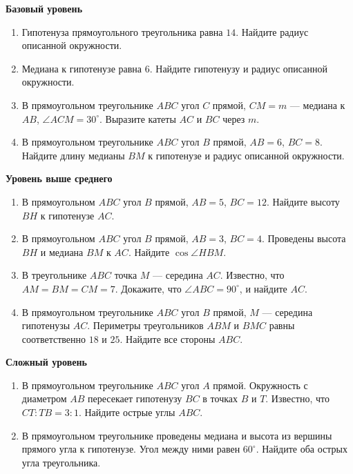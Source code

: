 \documentclass[a4paper,11pt]{article}
\begin{document}
\textcolor{darkaccent}{\textbf{Базовый уровень}}
\begin{enumerate}[label=\textbf{\arabic*.},itemsep=9pt]
\item Гипотенуза прямоугольного треугольника равна $14$. Найдите радиус описанной окружности.
\item Медиана к гипотенузе равна $6$. Найдите гипотенузу и радиус описанной окружности.
\item В прямоугольном треугольнике $ABC$ угол $C$ прямой, $CM=m$ --- медиана к $AB$, $\angle ACM=30^\circ$. Выразите катеты $AC$ и $BC$ через $m$.
\item В прямоугольном треугольнике $ABC$ угол $B$ прямой, $AB=6$, $BC=8$. Найдите длину медианы $BM$ к гипотенузе и радиус описанной окружности.
\end{enumerate}
\textcolor{darkaccent}{\textbf{Уровень выше среднего}}
\begin{enumerate}[label=\textbf{\arabic*.},start=5,itemsep=9pt]
\item В прямоугольном $ABC$ угол $B$ прямой, $AB=5$, $BC=12$. Найдите высоту $BH$ к гипотенузе $AC$.
\item В прямоугольном $ABC$ угол $B$ прямой, $AB=3$, $BC=4$. Проведены высота $BH$ и медиана $BM$ к $AC$. Найдите $\cos\angle HBM$.
\item В треугольнике $ABC$ точка $M$ --- середина $AC$. Известно, что $AM=BM=CM=7$. Докажите, что $\angle ABC=90^\circ$, и найдите $AC$.
\item В прямоугольном треугольнике $ABC$ угол $B$ прямой, $M$ --- середина гипотенузы $AC$. Периметры треугольников $ABM$ и $BMC$ равны соответственно $18$ и $25$. Найдите все стороны $ABC$.
\end{enumerate}
\textcolor{darkaccent}{\textbf{Сложный уровень}}
\begin{enumerate}[label=\textbf{\arabic*.},start=9,itemsep=9pt]
\item В прямоугольном треугольнике $ABC$ угол $A$ прямой. Окружность с диаметром $AB$ пересекает гипотенузу $BC$ в точках $B$ и $T$. Известно, что $CT:TB=3:1$. Найдите острые углы $ABC$.
\item В прямоугольном треугольнике проведены медиана и высота из вершины прямого угла к гипотенузе. Угол между ними равен $60^\circ$. Найдите оба острых угла треугольника.
\end{enumerate}
\clearpage
\end{document}
